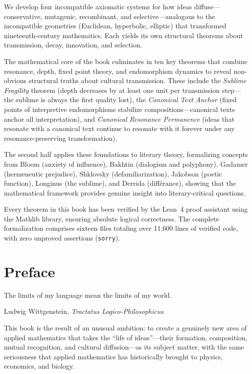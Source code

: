 \documentclass[11pt,openany]{book}
\theoremstyle{definition}
\theoremstyle{plain}
\theoremstyle{remark}
\begin{document}
We develop four incompatible axiomatic systems for how ideas diffuse---conservative, mutagenic, recombinant, and selective---analogous to the incompatible geometries (Euclidean, hyperbolic, elliptic) that transformed nineteenth-century mathematics. Each yields its own structural theorems about transmission, decay, innovation, and selection.

The mathematical core of the book culminates in ten key theorems that combine resonance, depth, fixed point theory, and endomorphism dynamics to reveal non-obvious structural truths about cultural transmission. These include the \emph{Sublime Fragility} theorem (depth decreases by at least one unit per transmission step---the sublime is always the first quality lost), the \emph{Canonical Text Anchor} (fixed points of interpretive endomorphisms stabilize compositions---canonical texts anchor all interpretation), and \emph{Canonical Resonance Permanence} (ideas that resonate with a canonical text continue to resonate with it forever under any resonance-preserving transformation).

The second half applies these foundations to literary theory, formalizing concepts from Bloom (anxiety of influence), Bakhtin (dialogism and polyphony), Gadamer (hermeneutic prejudice), Shklovsky (defamiliarization), Jakobson (poetic function), Longinus (the sublime), and Derrida (diff\'erance), showing that the mathematical framework provides genuine insight into literary-critical questions.

Every theorem in this book has been verified by the Lean~4 proof assistant using the Mathlib library, ensuring absolute logical correctness. The complete formalization comprises sixteen files totaling over 11,600 lines of verified code, with zero unproved assertions (\texttt{sorry}).

\clearpage

\chapter*{Preface}

\epigraph{The limits of my language mean the limits of my world.}{Ludwig Wittgenstein, \textit{Tractatus Logico-Philosophicus}}

This book is the result of an unusual ambition: to create a genuinely new area of applied mathematics that takes the ``life of ideas''---their formation, composition, mutual recognition, and cultural diffusion---as its subject matter, with the same seriousness that applied mathematics has historically brought to physics, economics, and biology.
\end{document}
